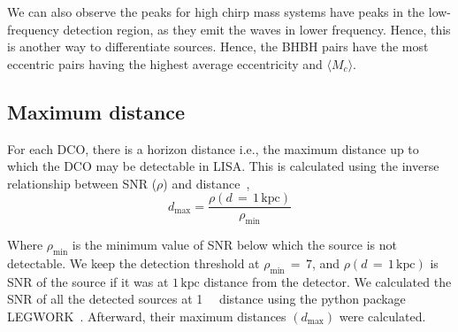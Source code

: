 \documentclass[journal, twocolumn]{IEEEtran}
\newcommand{\kpc}{\kilo\parsec}
\begin{document}
    We can also observe the peaks for high chirp mass systems have peaks in the low-frequency detection region, as they emit the waves in lower frequency.
    Hence, this is another way to differentiate sources.
    Hence, the BHBH pairs have the most eccentric pairs having the highest average eccentricity and $\langle M_c\rangle$.

%

    \subsection{Maximum distance}\label{subsec:maximum-distance}
    For each DCO, there is a horizon distance i.e., the maximum distance up to which the DCO may be detectable in
    LISA. This is calculated using the inverse relationship between SNR ($\rho$) and distance~\cite{Lau2020},
    \begin{equation}
        \label{eq:eq1}
        d_\text{max}=\frac{\rho(d\,=\,1\,\text{kpc})}{\rho_\text{min}}
    \end{equation}

    Where $\rho_{\min}$ is the minimum value of SNR below which the source is not detectable.
    We keep the detection threshold at $\rho_{\min}\,=\,7$, and $\rho(d\,=\,1\,\text{kpc})$ is SNR of the source if it was at $1\,\text{kpc}$ distance from the detector.
    We calculated the SNR of all the detected sources at \SI{1}{\kpc} distance using the python package LEGWORK~\cite{wagg2021legwork}.
    Afterward, their maximum distances $(d_{\max})$ were calculated.
\end{document}
